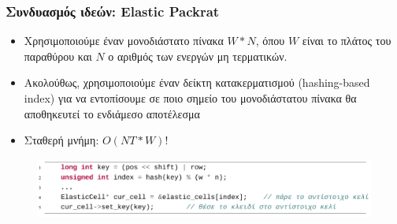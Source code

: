 \documentclass{beamer}
\begin{document}
\begin{frame}
  \frametitle{Συνδυασμός ιδεών: Elastic Packrat}
	\begin{itemize}
	  \item Χρησιμοποιούμε έναν μονοδιάστατο πίνακα $W*N$, όπου $W$ είναι το πλάτος του παραθύρου και $N$ ο αριθμός των ενεργών μη τερματικών.
	  \item Ακολούθως, χρησιμοποιούμε έναν δείκτη κατακερματισμού (hashing-based index) για να εντοπίσουμε σε ποιο σημείο του μονοδιάστατου πίνακα θα αποθηκευτεί το ενδιάμεσο αποτέλεσμα
	  \item<2-> Σταθερή μνήμη: $O(NT * W)$!
	\end{itemize}

\begin{figure}[h]
    \centering
	\includegraphics[width=1.10\textwidth]{pics/hash}
\end{figure} 

\end{frame}
\end{document}

